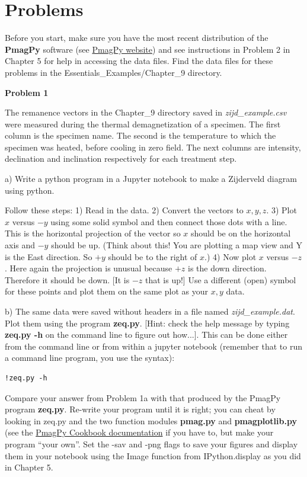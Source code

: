 \section{Problems}
{\parindent 0pt  \parskip 6pt

Before you start, make sure you have the most recent distribution of the {\bf PmagPy} software (see \href{http://earthref.org/PmagPy/cookbook/}{PmagPy website}) and see instructions in Problem 2 in Chapter 5 for help in accessing the data files.  Find the data files for these problems in the Essentials\_Examples/Chapter\_9 directory.    


  
{\bf Problem 1 }

The remanence vectors in the Chapter\_9 directory saved in {\it zijd\_example.csv} were measured during the 
thermal demagnetization of a specimen.  The first column is the specimen name. The second is the temperature to which the specimen was heated, before cooling in zero field.  The next columns are intensity, declination and inclination respectively for each   treatment step.  

a) Write a python program in a Jupyter notebook to make a Zijderveld diagram using python.  
 
Follow these steps:  1) Read in the data.  2) Convert the vectors to $x, y, z$.  3) Plot $x$ versus $-y$ using some solid symbol and then connect those dots with a line.  This is the horizontal projection  of the vector so $x$ should be on the horizontal axis and $-y$ should be up. (Think about this!   You are plotting a map view and Y is the East direction.  So $+y$ should be to the right of $x$.)   4) Now plot $ x $ versus $-z$.  Here again the projection is unusual because $+z$ is the down direction. Therefore it should be down.  [It is  $-z$ that is up!]    Use a different (open) symbol for these points and plot them on the same plot as your $x,y$ data.   

b) The same data were saved without headers in a file named  {\it zijd\_example.dat}.  Plot them using the program {\bf zeq.py}. [Hint:  check the help message by typing {\bf zeq.py -h} on the command line to figure out how...].  This can be done either from the command line or from within a jupyter notebook (remember that to run a command line program, you use the syntax):
\begin {verbatim}
!zeq.py -h
\end{verbatim}

Compare your answer from Problem 1a  with that produced by the PmagPy program {\bf zeq.py}.  Re-write your program until it is right; you can cheat by looking in zeq.py and the two function modules {\bf pmag.py} and {\bf pmagplotlib.py}  (see the \href{https://earthref.org/PmagPy/#zeq.py}{PmagPy Cookbook documentation}   if you have to, but make your program ``your own''.   Set the -sav and -png flags to save your figures and display them in your notebook using the Image function from IPython.display as you did in Chapter 5.  



}

